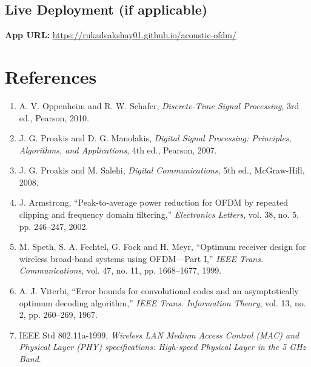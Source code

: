 \documentclass[11pt,a4paper]{report}
\begin{document}
\section{Live Deployment (if applicable)}
\textbf{App URL:} \url{https://rukadeakshay01.github.io/acoustic-ofdm/}

\chapter*{References}

\begin{enumerate}
    \item A. V. Oppenheim and R. W. Schafer, \textit{Discrete-Time Signal Processing}, 3rd ed., Pearson, 2010.
    \item J. G. Proakis and D. G. Manolakis, \textit{Digital Signal Processing: Principles, Algorithms, and Applications}, 4th ed., Pearson, 2007.
    \item J. G. Proakis and M. Salehi, \textit{Digital Communications}, 5th ed., McGraw-Hill, 2008.
    \item J. Armstrong, ``Peak-to-average power reduction for OFDM by repeated clipping and frequency domain filtering,'' \textit{Electronics Letters}, vol. 38, no. 5, pp. 246--247, 2002.
    \item M. Speth, S. A. Fechtel, G. Fock and H. Meyr, ``Optimum receiver design for wireless broad-band systems using OFDM---Part I,'' \textit{IEEE Trans. Communications}, vol. 47, no. 11, pp. 1668--1677, 1999.
    \item A. J. Viterbi, ``Error bounds for convolutional codes and an asymptotically optimum decoding algorithm,'' \textit{IEEE Trans. Information Theory}, vol. 13, no. 2, pp. 260--269, 1967.
    \item IEEE Std 802.11a-1999, \textit{Wireless LAN Medium Access Control (MAC) and Physical Layer (PHY) specifications: High-speed Physical Layer in the 5 GHz Band}.
\end{enumerate}
\end{document}
